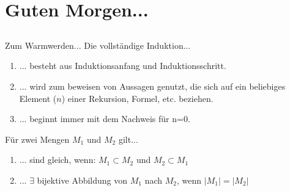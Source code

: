 \section[Einstieg]{Guten Morgen...}
\subsection*{}
\begin{frame}{Zum Warmwerden...}
  Die vollständige Induktion...
    \begin{enumerate}
    \item { 
    ... besteht aus Induktionsanfang und Induktionsschritt.
    }
    \item { 
    ... wird zum beweisen von Aussagen genutzt, die sich auf ein beliebiges Element ($n$) einer Rekursion, Formel, etc. beziehen.
    }
    \item { 
    ... beginnt immer mit dem Nachweis für n=0.
    }
    \end{enumerate}

  Für zwei Mengen $M_1$ und $M_2$ gilt...
    \begin{enumerate}
    \item { 
    ... sind gleich, wenn: $M_1 \subset M_2$ und $M_2 \subset M_1$
    }
    \item { 
    ... $\exists$ bijektive Abbildung von $M_1$ nach $M_2$, wenn $\left|M_1\right| = \left|M_2\right|$
    }
    \end{enumerate}
\end{frame}

